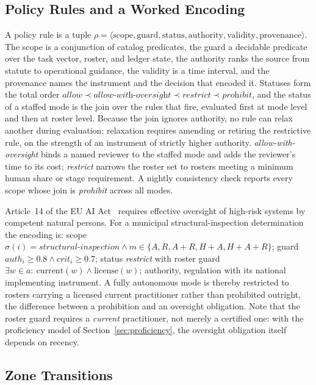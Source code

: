 \documentclass[utf8]{frontiers_suppmat}
\begin{document}
\subsection{Policy Rules and a Worked Encoding}
\label{app:framework-policy}

A policy rule is a tuple $\rho=\langle\mathrm{scope},\mathrm{guard},\mathrm{status},\mathrm{authority},\mathrm{validity},\mathrm{provenance}\rangle$. The scope is a conjunction of catalog predicates, the guard a decidable predicate over the task vector, roster, and ledger state, the authority ranks the source from statute to operational guidance, the validity is a time interval, and the provenance names the instrument and the decision that encoded it. Statuses form the total order $\textit{allow}\prec\textit{allow-with-oversight}\prec\textit{restrict}\prec\textit{prohibit}$, and the status of a staffed mode is the join over the rules that fire, evaluated first at mode level and then at roster level. Because the join ignores authority, no rule can relax another during evaluation; relaxation requires amending or retiring the restrictive rule, on the strength of an instrument of strictly higher authority. \textit{allow-with-oversight} binds a named reviewer to the staffed mode and adds the reviewer's time to its cost; \textit{restrict} narrows the roster set to rosters meeting a minimum human share or stage requirement. A nightly consistency check reports every scope whose join is \textit{prohibit} across all modes.

Article~14 of the EU AI Act~\citep{EUAIAct2024} requires effective oversight of high-risk systems by competent natural persons. For a municipal structural-inspection determination the encoding is: scope $\sigma(i)=\textit{structural-inspection}\wedge m\in\{A,R,A{+}R,H{+}A,H{+}A{+}R\}$; guard $auth_i\ge0.8\wedge crit_i\ge0.7$; status \textit{restrict} with roster guard $\exists w\in a:\ \text{current}(w)\wedge\mathrm{license}(w)$; authority, regulation with its national implementing instrument. A fully autonomous mode is thereby restricted to rosters carrying a licensed current practitioner rather than prohibited outright, the difference between a prohibition and an oversight obligation. Note that the roster guard requires a \textit{current} practitioner, not merely a certified one: with the proficiency model of Section~\ref{sec:proficiency}, the oversight obligation itself depends on recency.

\subsection{Zone Transitions}
\label{app:framework-zones}
\end{document}
